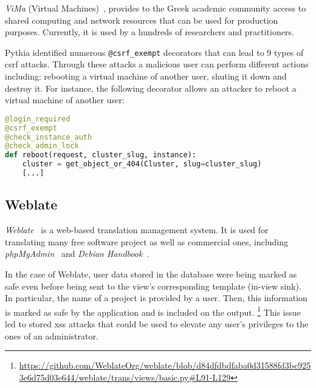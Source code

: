 {\it ViMa} (Virtual Machines)~\cite{vima},
provides to the Greek academic community
access to shared computing and network resources that can be used
for production purposes.
Currently,
it is used by a hundreds of researchers
and practitioners.

Pythia identified numerous
{\tt @csrf\_exempt} decorators
that can lead to 9 types of
{\sc csrf} attacks.
Through these attacks a malicious
user can perform different actions including:
rebooting a virtual machine of another user,
shuting it down and destroy it.
For instance,
the following decorator 
allows an attacker to reboot
a virtual machine of another user:

\vspace{0.8mm}
\begin{lstlisting}[language=Python, basicstyle=\footnotesize\ttfamily]
@login_required
@csrf_exempt
@check_instance_auth
@check_admin_lock
def reboot(request, cluster_slug, instance):
    cluster = get_object_or_404(Cluster, slug=cluster_slug)
    [...]
\end{lstlisting}
\vspace{0.8mm}

\subsection{Weblate}
\label{sec:weblate}
\begin{comment}
https://github.com/WeblateOrg/weblate/blob/d84dfdbdfaba0d31588fd3bc9253e6d75d03e644/weblate/trans/views/basic.py#L91-L129
\end{comment}
{\it Weblate}~\cite{weblate} is a web-based
translation management system.
It is  used for translating many free
software project as well as commercial ones,
including
{\it phpMyAdmin}~\cite{phpma} and
{\it Debian Handbook}~\cite{dhbk}.

In the case of Weblate,
user data stored in the database
were being marked as safe
even before being sent to the view's corresponding template (in-view sink).
In particular,
the name of a project is provided by a user.
Then,
this information is marked as safe by
the application and is included on
the output. {\footnote{\url{https://github.com/WeblateOrg/weblate/blob/d84dfdbdfaba0d31588fd3bc9253e6d75d03e644/weblate/trans/views/basic.py\#L91-L129}}}
This issue led to stored {\sc xss} attacks
that could be used to elevate any user's privileges to the ones of an administrator.


